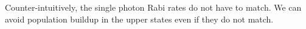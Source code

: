 Counter-intuitively, the single photon Rabi rates do not have to match. We can avoid population buildup in the upper states even if they do not match. 



